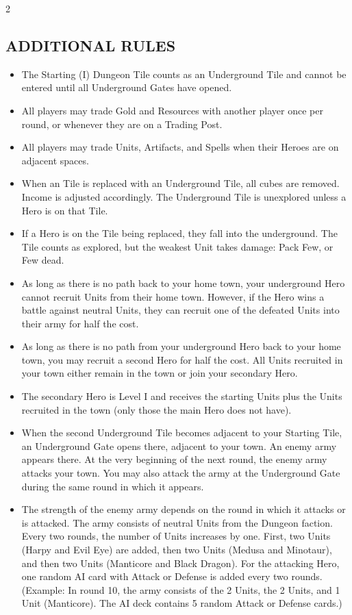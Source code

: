 \begin{multicols*}{2}
\subsection*{\MakeUppercase{Additional Rules}}
\begin{itemize}
\item The Starting (I) Dungeon Tile counts as an Underground Tile and cannot be entered until all Underground Gates have opened.
\item All players may trade Gold and Resources with another player once per round, or whenever they are on a Trading Post.
\item All players may trade Units, Artifacts, and Spells when their Heroes are on adjacent spaces.
\item When an Tile is replaced with an Underground Tile, all cubes are removed. Income is adjusted accordingly. The Underground Tile is unexplored unless a Hero is on that Tile.
\item If a Hero is on the Tile being replaced, they fall into the underground. The Tile counts as explored, but the weakest Unit takes damage: Pack \rightarrow Few, or Few \rightarrow dead.
\item As long as there is no path back to your home town, your underground Hero cannot recruit Units from their home town. However, if the Hero wins a battle against neutral Units, they can recruit one of the defeated Units into their army for half the cost.
\item As long as there is no path from your underground Hero back to your home town, you may recruit a second Hero for half the cost. All Units recruited in your town either remain in the town or join your secondary Hero.
\item The secondary Hero is Level I and receives the starting Units plus the Units recruited in the town (only those the main Hero does not have).
\item When the second Underground Tile becomes adjacent to your Starting Tile, an Underground Gate opens there, adjacent to your town. An enemy army appears there. At the very beginning of the next round, the enemy army attacks your town. You may also attack the army at the Underground Gate during the same round in which it appears.
\item The strength of the enemy army depends on the round in which it attacks or is attacked. The army consists of neutral Units from the Dungeon faction. Every two rounds, the number of Units increases by one. First, two  Units (Harpy and Evil Eye) are added, then two  Units (Medusa and Minotaur), and then two  Units (Manticore and Black Dragon). For the attacking Hero, one random AI card with Attack or Defense is added every two rounds. (Example: In round 10, the army consists of the 2  Units, the 2  Units, and 1  Unit (Manticore). The AI deck contains 5 random Attack or Defense cards.)

\end{itemize}
\end{multicols*}

